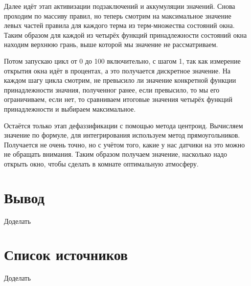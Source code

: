 \documentclass[a4paper]{article}
\begin{document}
Далее идёт этап активизации подзаключений и аккумуляции значений. 
Снова проходим по массиву правил, но теперь смотрим на 
максимальное значение левых частей правила для каждого терма из 
терм-множества состояний окна. Таким образом для каждой из четырёх
функций принадлежности состояний окна находим верхнюю грань, выше 
которой мы значение не рассматриваем.

Потом запускаю цикл от 0 до 100 включительно, с шагом 1, так как
измерение открытия окна идёт в процентах, а это получается дискретное
значение. На каждом шагу цикла смотрим, не превысило ли значение
конкретной функции принадлежности значния, полученног ранее, если превысило,
то мы его ограничиваем, если нет, то сравниваем итоговые значения
четырёх функций принадлежности и выбираем максимальное.

Остаётся только этап дефаззификации с помощью метода центроид.
Вычисляем значение по формуле, для интегрирования используем метод
прямоугольников. Получается не очень точно, но с учётом того, какие у нас
датчики на это можно не обращать внимания.
Таким образом получаем значение, насколько надо открыть окно, чтобы 
сделать в комнате оптимальную атмосферу.

\section{Вывод}
Доделать

\section{Список источников}
Доделать
\end{document}
